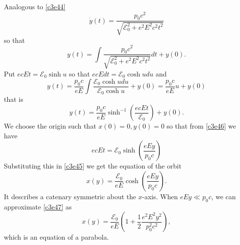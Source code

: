 \begin{enumerate}
Analogous to \eqref{c3e44}
\[
\dot{y}(t) = \frac{p_0c^2}{\sqrt{\mathcal{E}_0^2 + e^2E^2c^2t^2}}
\]
so that
\[
y(t) = \int \frac{p_0c^2}{\sqrt{\mathcal{E}_0^2 + e^2E^2c^2t^2}} dt + y(0).
\]
Put $ecEt = \mathcal{E}_0\sinh u$ so that $ecEdt = \mathcal{E}_0\cosh u du$
and
\[
y(t) = \frac{p_0c}{eE}\int \frac{\mathcal{E}_0\cosh u du}{\mathcal{E}_0\cosh u}
 + y(0) = \frac{p_0c}{eE} u + y(0) 
\]
that is
\begin{equation}\label{c3e46}
y(t) = \frac{p_0c}{eE} \sinh^{-1}\left(\frac{ecEt}{\mathcal{E}_0}\right) + y(0).
\end{equation}
We choose the origin such that $x(0) = 0, y(0) = 0$ so that from \eqref{c3e46}
we have
\[
ecEt = \mathcal{E}_0\sinh\left(\frac{eEy}{p_0c}\right)
\]
Substituting this in \eqref{c3e45} we get the equation of the orbit
\begin{equation}\label{c3e47}
x(y) = \frac{\mathcal{E}_0}{eE}\cosh\left(\frac{eEy}{p_0c}\right).
\end{equation}
It describes a catenary symmetric about the $x$-axis. When $eEy \ll p_0c$, we
can approximate \eqref{c3e47} as
\begin{equation}\label{c3e48}
x(y) = \frac{\mathcal{E}_0}{eE}\left(1 + \frac{1}{2}\frac{e^2E^2y^2}{p_0^2c^2}\right),
\end{equation}
which is an equation of a parabola.


\end{enumerate}
